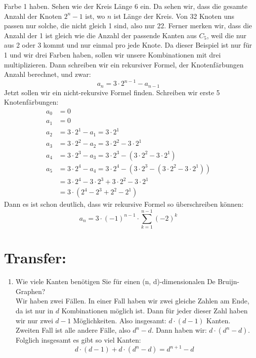 Farbe 1 haben. Sehen wie der Kreis Länge 6 ein. Da sehen wir, dass die gesamte Anzahl der 
        Knoten $2^n-1$ ist, wo $n$ ist Länge der Kreis. Von 32 Knoten uns passen nur solche, die nicht 
        gleich 1 sind, also nur 22. Ferner merken wir, dass die Anzahl der 1 ist gleich wie die Anzahl 
        der passende Kanten aus $C_5$, weil die nur aus 2 oder 3 kommt und nur einmal pro jede Knote. 
        Da dieser Beispiel ist nur für 1 und wir drei Farben haben, sollen wir unsere Kombinationen 
        mit drei multiplizieren. Dann schreiben wir ein rekursiver Formel, der Knotenfärbungen Anzahl 
        berechnet, und zwar: $$ a_n = 3\cdot 2^{n-1} - a_{n-1} $$
        Jetzt sollen wir ein nicht-rekursive Formel finden. Schreiben wir erste 5 Knotenfärbungen:
        \begin{align*}
            a_0 &= 0\\
            a_1 &= 0\\
            a_2 &= 3\cdot 2^1 - a_1 = 3\cdot 2^1\\
            a_3 &= 3\cdot 2^2 - a_2 = 3\cdot 2^2 - 3\cdot 2^1\\
            a_4 &= 3\cdot 2^3 - a_3 = 3\cdot 2^3 - (3\cdot 2^2 - 3\cdot 2^1)\\
            a_5 &= 3\cdot 2^4 - a_4 = 3\cdot 2^4 - (3\cdot 2^3 - (3\cdot 2^2 - 3\cdot 2^1))\\
            &= 3\cdot 2^4 - 3\cdot 2^3 + 3\cdot 2^2 - 3\cdot 2^1\\
            &= 3\cdot (2^4 - 2^3 + 2^2 - 2^1)
        \end{align*} 
        Dann es ist schon deutlich, dass wir rekursive Formel so überschreiben können:
        $$ a_n = 3 \cdot (-1)^{n-1} \cdot \sum_{k=1}^{n-1}(-2)^k$$
    \section*{Transfer:}
    \begin{enumerate}[label=(\alph*)]
    	\item Wie viele Kanten benötigen Sie für einen (n, d)-dimensionalen De Bruijn-Graphen?\\
        Wir haben zwei Fällen. In einer Fall haben wir zwei gleiche Zahlen am Ende, da ist nur in $d$ 
        Kombinationen möglich ist. Dann für jeder dieser Zahl haben wir nur zwei $d-1$ Möglichkeiten. 
        Also insgesamt: $d\cdot(d-1)$ Kanten. Zweiten Fall ist alle andere Fälle, also $d^n-d$. Dann haben
        wir: $d\cdot(d^n-d)$. Folglich insgesamt es gibt so viel Kanten:
        $$d\cdot(d-1) + d\cdot(d^n-d) = d^{n+1}-d$$
    \end{enumerate}
